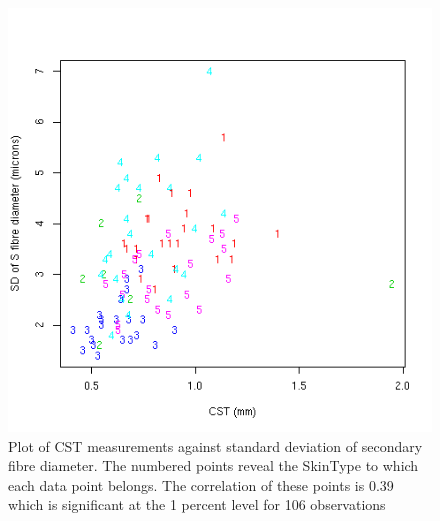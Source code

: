 %

\begin{figure}[!h]
  \centering
  \includegraphics[width=1.0\textwidth]{cstdssd.png}
  \caption{Plot of CST measurements against standard deviation of secondary fibre diameter. The numbered points reveal the SkinType to which each data point belongs. The correlation of these points is 0.39 which is significant at the 1 percent level for 106 observations}
  \label{fig:cstdssd}
\end{figure}

%

